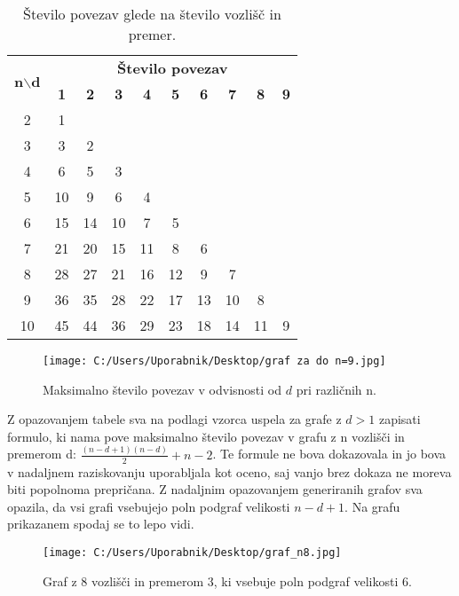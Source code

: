 \documentclass[12pt,a4paper]{amsart}
\theoremstyle{definition} %
\theoremstyle{plain} %
\begin{document}
\begin{table}[h]
    \centering
    \begin{tabular}{|c|*{9}{c|}} 
    \hline
    \multirow{2}{*}{\textbf{n$\backslash$d}} & \multicolumn{9}{c|}{\textbf{Število povezav}} \\ \cline{2-10}
    & \textbf{1} & \textbf{2} & \textbf{3} & \textbf{4} & \textbf{5} & \textbf{6} & \textbf{7} & \textbf{8} & \textbf{9} \\ 
    \hline
    2 & 1 & & & & & & & & \\ 
    3 & 3 & 2 & & & & & & & \\ 
    4 & 6 & 5 & 3 & & & & & & \\
    5 & 10 & 9 & 6 & 4 & & & & & \\
    6 & 15 & 14 & 10 & 7 & 5 & & & & \\ 
    7 & 21 & 20 & 15 & 11 & 8 & 6 & & & \\ 
    8 & 28 & 27 & 21 & 16 & 12 & 9 & 7 & & \\ 
    9 & 36 & 35 & 28 & 22 & 17 & 13 & 10 & 8 & \\ 
    10 & 45 & 44 & 36 & 29 & 23 & 18 & 14 & 11 & 9 \\ 
    \hline
    \end{tabular}
    \caption{Število povezav glede na število vozlišč in premer.}
    \label{tab:tabela1}
\end{table}

\begin{figure}[h]
    \centering
    \texttt{[image: C:/Users/Uporabnik/Desktop/graf za do n=9.jpg]}
    \caption{Maksimalno število povezav v odvisnosti od \(d\) pri različnih n.}
    \label{fig:slika1}
\end{figure}

\pagebreak
\noindent Z opazovanjem tabele sva na podlagi vzorca uspela za grafe z $d > 1$ zapisati formulo, ki nama pove
maksimalno število povezav v grafu z n vozlišči in premerom d: $\frac{(n - d + 1)(n - d)}{2} + n - 2$. Te formule
ne bova dokazovala in jo bova v nadaljnem raziskovanju uporabljala kot oceno, saj vanjo brez dokaza ne moreva biti
popolnoma prepričana. \newline 
Z nadaljnim opazovanjem generiranih grafov sva opazila, da vsi grafi vsebujejo poln podgraf velikosti $n - d + 1$. Na grafu prikazanem spodaj
se to lepo vidi. \\

\begin{figure}[h]
    \centering
    \texttt{[image: C:/Users/Uporabnik/Desktop/graf\_n8.jpg]} %
    \caption{Graf z 8 vozlišči in premerom 3, ki vsebuje poln podgraf velikosti 6.}
    \label{fig:slika2}
\end{figure}
\end{document}
